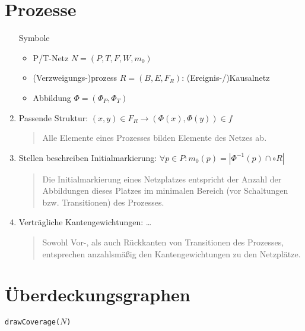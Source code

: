 \documentclass{article}
\begin{document}
\section{Prozesse}

\begin{enumerate}
  \item[Symbole]
        \begin{itemize}
          \item P/T-Netz $N = (P,T,F,W,m_0)$
          \item (Verzweigungs-)prozess $R=(B,E,F_R)$: (Ereignis-/)Kausalnetz
          \item Abbildung $\Phi =(\Phi_P,\Phi_T)$
        \end{itemize}
  \item Passende Struktur: $(x,y)\in F_R \to (\Phi(x), \Phi(y))\in f$
        \begin{quote}
          Alle Elemente eines Prozesses bilden Elemente des Netzes ab.
        \end{quote}
  \item Stellen beschreiben Initialmarkierung: $\forall p\in P: m_0(p)=|\Phi^{-1}(p)\cap \circ R|$
        \begin{quote}
          Die Initialmarkierung eines Netzplatzes entspricht der Anzahl der Abbildungen dieses Platzes im minimalen Bereich (vor Schaltungen bzw. Transitionen) des Prozesses.
        \end{quote}
  \item Verträgliche Kantengewichtungen: …
        \begin{quote}
          Sowohl Vor-, als auch Rückkanten von Transitionen des Prozesses, entsprechen anzahlsmäßig den Kantengewichtungen zu den Netzplätze.
        \end{quote}
\end{enumerate}

\section{Überdeckungsgraphen}

\begin{algorithm}[H]
  \caption{\texttt{drawCoverage($N$)}}

  \BlankLine

\end{algorithm}
\end{document}
